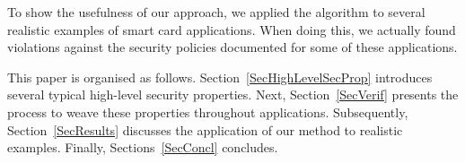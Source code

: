 
To show the usefulness of our approach, we applied the algorithm to
several realistic examples of smart card applications. When doing
this, we actually found violations against the security policies
documented for some of these applications.

This paper is organised as follows. Section~\ref{SecHighLevelSecProp}
introduces several typical high-level security properties. Next,
Section~\ref{SecVerif} presents the process to weave these properties
throughout applications. Subsequently, Section~\ref{SecResults}
discusses the application of our method to realistic
examples. Finally, Sections~\ref{SecConcl} concludes.






